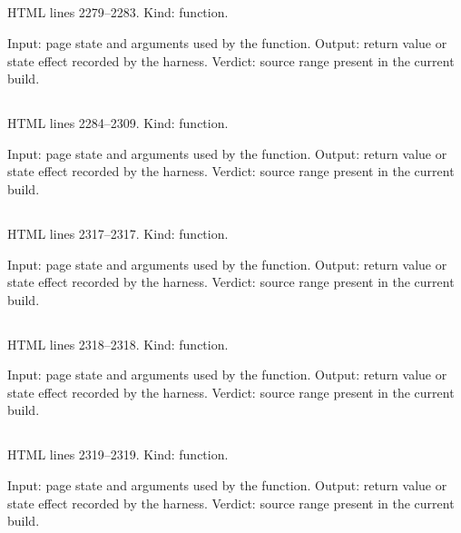 \subsection*{\texttt{}}
\label{vf_50_dosStamp}
HTML lines 2279--2283. Kind: function.

Input: page state and arguments used by the function.
Output: return value or state effect recorded by the harness.
Verdict: source range present in the current build.

\subsection*{\texttt{}}
\label{vf_51_makeStoredZip}
HTML lines 2284--2309. Kind: function.

Input: page state and arguments used by the function.
Output: return value or state effect recorded by the harness.
Verdict: source range present in the current build.

\subsection*{\texttt{}}
\label{vf_52_propText}
HTML lines 2317--2317. Kind: function.

Input: page state and arguments used by the function.
Output: return value or state effect recorded by the harness.
Verdict: source range present in the current build.

\subsection*{\texttt{}}
\label{vf_53_pv}
HTML lines 2318--2318. Kind: function.

Input: page state and arguments used by the function.
Output: return value or state effect recorded by the harness.
Verdict: source range present in the current build.

\subsection*{\texttt{}}
\label{vf_54_propValues}
HTML lines 2319--2319. Kind: function.

Input: page state and arguments used by the function.
Output: return value or state effect recorded by the harness.
Verdict: source range present in the current build.

